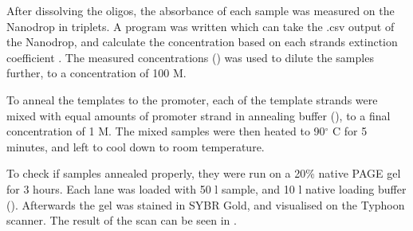 After dissolving the oligos, the absorbance of each sample was measured on the Nanodrop in triplets. A program was written which can take the .csv output of the Nanodrop, and calculate the concentration based on each strands extinction coefficient \cite{nanodropimport}. The measured concentrations () was used to dilute the samples further, to a concentration of 100 \si{\micro}M.

To anneal the templates to the promoter, each of the template strands were mixed with equal amounts of promoter strand in annealing buffer (), to a final concentration of 1 \si{\micro}M. The mixed samples were then heated to 90$^\circ$ C for 5 minutes, and left to cool down to room temperature.

To check if samples annealed properly, they were run on a 20\% native PAGE gel for 3 hours. Each lane was loaded with 50 \si{\micro}l sample, and 10 \si{\micro}l native loading buffer (). Afterwards the gel was stained in SYBR Gold, and visualised on the Typhoon scanner. The result of the scan can be seen in .

